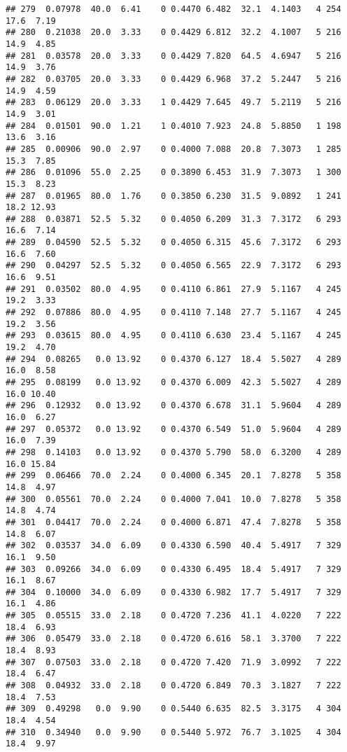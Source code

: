 \documentclass[
]{article}
\begin{document}
\begin{verbatim}
## 279  0.07978  40.0  6.41    0 0.4470 6.482  32.1  4.1403   4 254    17.6  7.19
## 280  0.21038  20.0  3.33    0 0.4429 6.812  32.2  4.1007   5 216    14.9  4.85
## 281  0.03578  20.0  3.33    0 0.4429 7.820  64.5  4.6947   5 216    14.9  3.76
## 282  0.03705  20.0  3.33    0 0.4429 6.968  37.2  5.2447   5 216    14.9  4.59
## 283  0.06129  20.0  3.33    1 0.4429 7.645  49.7  5.2119   5 216    14.9  3.01
## 284  0.01501  90.0  1.21    1 0.4010 7.923  24.8  5.8850   1 198    13.6  3.16
## 285  0.00906  90.0  2.97    0 0.4000 7.088  20.8  7.3073   1 285    15.3  7.85
## 286  0.01096  55.0  2.25    0 0.3890 6.453  31.9  7.3073   1 300    15.3  8.23
## 287  0.01965  80.0  1.76    0 0.3850 6.230  31.5  9.0892   1 241    18.2 12.93
## 288  0.03871  52.5  5.32    0 0.4050 6.209  31.3  7.3172   6 293    16.6  7.14
## 289  0.04590  52.5  5.32    0 0.4050 6.315  45.6  7.3172   6 293    16.6  7.60
## 290  0.04297  52.5  5.32    0 0.4050 6.565  22.9  7.3172   6 293    16.6  9.51
## 291  0.03502  80.0  4.95    0 0.4110 6.861  27.9  5.1167   4 245    19.2  3.33
## 292  0.07886  80.0  4.95    0 0.4110 7.148  27.7  5.1167   4 245    19.2  3.56
## 293  0.03615  80.0  4.95    0 0.4110 6.630  23.4  5.1167   4 245    19.2  4.70
## 294  0.08265   0.0 13.92    0 0.4370 6.127  18.4  5.5027   4 289    16.0  8.58
## 295  0.08199   0.0 13.92    0 0.4370 6.009  42.3  5.5027   4 289    16.0 10.40
## 296  0.12932   0.0 13.92    0 0.4370 6.678  31.1  5.9604   4 289    16.0  6.27
## 297  0.05372   0.0 13.92    0 0.4370 6.549  51.0  5.9604   4 289    16.0  7.39
## 298  0.14103   0.0 13.92    0 0.4370 5.790  58.0  6.3200   4 289    16.0 15.84
## 299  0.06466  70.0  2.24    0 0.4000 6.345  20.1  7.8278   5 358    14.8  4.97
## 300  0.05561  70.0  2.24    0 0.4000 7.041  10.0  7.8278   5 358    14.8  4.74
## 301  0.04417  70.0  2.24    0 0.4000 6.871  47.4  7.8278   5 358    14.8  6.07
## 302  0.03537  34.0  6.09    0 0.4330 6.590  40.4  5.4917   7 329    16.1  9.50
## 303  0.09266  34.0  6.09    0 0.4330 6.495  18.4  5.4917   7 329    16.1  8.67
## 304  0.10000  34.0  6.09    0 0.4330 6.982  17.7  5.4917   7 329    16.1  4.86
## 305  0.05515  33.0  2.18    0 0.4720 7.236  41.1  4.0220   7 222    18.4  6.93
## 306  0.05479  33.0  2.18    0 0.4720 6.616  58.1  3.3700   7 222    18.4  8.93
## 307  0.07503  33.0  2.18    0 0.4720 7.420  71.9  3.0992   7 222    18.4  6.47
## 308  0.04932  33.0  2.18    0 0.4720 6.849  70.3  3.1827   7 222    18.4  7.53
## 309  0.49298   0.0  9.90    0 0.5440 6.635  82.5  3.3175   4 304    18.4  4.54
## 310  0.34940   0.0  9.90    0 0.5440 5.972  76.7  3.1025   4 304    18.4  9.97

\end{verbatim}
\end{document}

